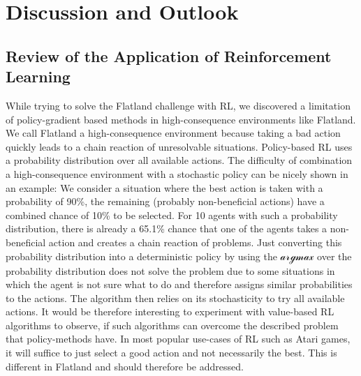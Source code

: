 %
%

\chapter{Discussion and Outlook}
\label{chap.diskussion}
\section{Review of the Application of Reinforcement Learning}\label{discussion_rl}
While trying to solve the Flatland challenge with RL, we discovered a limitation of policy-gradient based methods in high-consequence environments like Flatland. 
We call Flatland a high-consequence environment because taking a bad action quickly leads to a chain reaction of unresolvable situations. Policy-based RL uses a probability distribution over all available actions. The difficulty of combination a high-consequence environment with a stochastic policy can be nicely shown in an example: We consider a situation where the best action is taken with a probability of 90\%, the remaining (probably non-beneficial actions) have a combined chance of 10\% to be selected. For 10 agents with such a probability distribution, there is already a 65.1\% chance that one of the agents takes a non-beneficial action and creates a chain reaction of problems. Just converting this probability distribution into a deterministic policy by using the $\mathcal{argmax}$ over the probability distribution does not solve the problem due to some situations in which the agent is not sure what to do and therefore assigns similar probabilities to the actions. The algorithm then relies on its stochasticity to try all available actions. It would be therefore interesting to experiment with value-based RL algorithms to observe, if such algorithms can overcome the described problem that policy-methods have. In most popular use-cases of RL such as Atari games, it will suffice to just select a good action and not necessarily the best. This is different in Flatland and should therefore be addressed.

